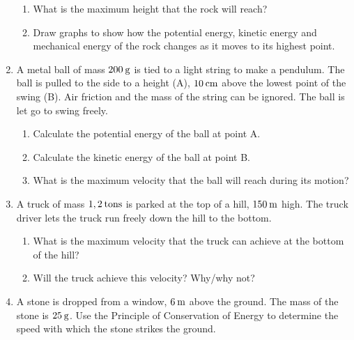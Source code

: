 \begin{enumerate}[noitemsep, label=\textbf{\arabic*}. ]
\label{m38786*id71971}\begin{enumerate}[noitemsep, label=\textbf{\alph*}. ] 
            \label{m38786*uid133}\item What is the maximum height that the rock will reach?
\label{m38786*uid134}\item Draw graphs to show how the potential energy, kinetic energy and mechanical energy of the rock changes as it moves to its highest point.
\end{enumerate}
                  \label{m38786*uid135}\item A metal ball of mass \begin{math}200\phantom{\rule{2pt}{0ex}}\mathrm{g}\end{math} is tied to a light string to make a pendulum. The ball is pulled to the side to a height (A), \begin{math}10\phantom{\rule{2pt}{0ex}}\mathrm{cm}\end{math} above the lowest point of the swing (B). Air friction and the mass of the string can be ignored. The ball is let go to swing freely.
\label{m38786*id72026}\begin{enumerate}[noitemsep, label=\textbf{\alph*}. ] 
            \label{m38786*uid136}\item Calculate the potential energy of the ball at point A.
\label{m38786*uid137}\item Calculate the kinetic energy of the ball at point B.
\label{m38786*uid138}\item What is the maximum velocity that the ball will reach during its motion?
\end{enumerate}
                \label{m38786*uid139}\item A truck of mass \begin{math}1,2\phantom{\rule{2pt}{0ex}}\mathrm{tons}\end{math} is parked at the top of a hill, \begin{math}150\phantom{\rule{2pt}{0ex}}\mathrm{m}\end{math} high. The truck driver lets the truck run freely down the hill to the bottom.
\label{m38786*id72082}\begin{enumerate}[noitemsep, label=\textbf{\alph*}. ] 
            \label{m38786*uid140}\item What is the maximum velocity that the truck can achieve at the bottom of the hill?
\label{m38786*uid141}\item Will the truck achieve this velocity? Why/why not?
\end{enumerate}
                \label{m38786*uid142}\item A stone is dropped from a window, \begin{math}6\phantom{\rule{2pt}{0ex}}\mathrm{m}\end{math} above the ground. The mass of the stone is \begin{math}25\phantom{\rule{2pt}{0ex}}\mathrm{g}\end{math}.
Use the Principle of Conservation of Energy to determine the speed with which the stone strikes the ground.
           \end{enumerate}
        
